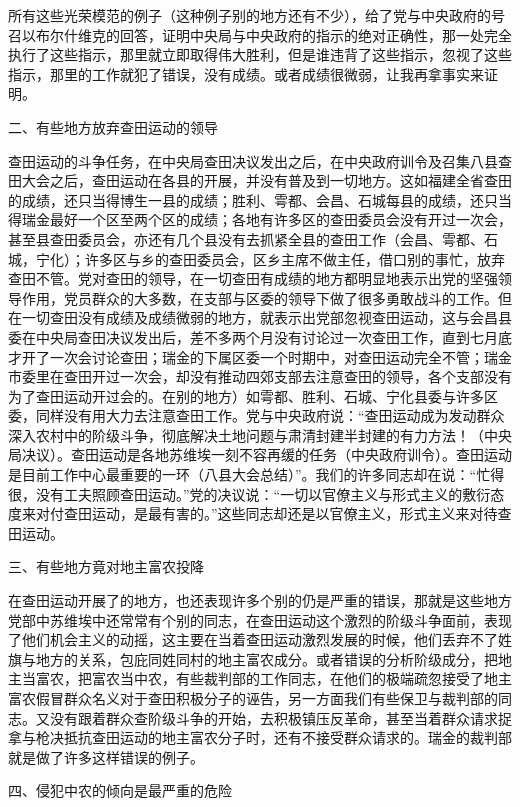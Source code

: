 所有这些光荣模范的例子（这种例子别的地方还有不少），给了党与中央政府的号召以布尔什维克的回答，证明中央局与中央政府的指示的绝对正确性，那一处完全执行了这些指示，那里就立即取得伟大胜利，但是谁违背了这些指示，忽视了这些指示，那里的工作就犯了错误，没有成绩。或者成绩很微弱，让我再拿事实来证明。

二、有些地方放弃查田运动的领导

查田运动的斗争任务，在中央局查田决议发出之后，在中央政府训令及召集八县查田大会之后，查田运动在各县的开展，并没有普及到一切地方。这如福建全省查田的成绩，还只当得博生一县的成绩；胜利、雩都、会昌、石城每县的成绩，还只当得瑞金最好一个区至两个区的成绩；各地有许多区的查田委员会没有开过一次会，甚至县查田委员会，亦还有几个县没有去抓紧全县的查田工作（会昌、雩都、石城，宁化）；许多区与乡的查田委员会，区乡主席不做主任，借口别的事忙，放弃查田不管。党对查田的领导，在一切查田有成绩的地方都明显地表示出党的坚强领导作用，党员群众的大多数，在支部与区委的领导下做了很多勇敢战斗的工作。但在一切查田没有成绩及成绩微弱的地方，就表示出党部忽视查田运动，这与会昌县委在中央局查田决议发出后，差不多两个月没有讨论过一次查田工作，直到七月底才开了一次会讨论查田；瑞金的下属区委一个时期中，对查田运动完全不管；瑞金市委里在查田开过一次会，却没有推动四郊支部去注意查田的领导，各个支部没有为了查田运动开过会的。在别的地方）如雩都、胜利、石城、宁化县委与许多区委，同样没有用大力去注意查田工作。党与中央政府说：“查田运动成为发动群众深入农村中的阶级斗争，彻底解决土地问题与肃清封建半封建的有力方法！（中央局决议）。查田运动是各地苏维埃一刻不容再缓的任务（中央政府训令）。查田运动是目前工作中心最重要的一环（八县大会总结）”。我们的许多同志却在说：“忙得很，没有工夫照顾查田运动。”党的决议说：“一切以官僚主义与形式主义的敷衍态度来对付查田运动，是最有害的。”这些同志却还是以官僚主义，形式主义来对待查田运动。

三、有些地方竟对地主富农投降

在查田运动开展了的地方，也还表现许多个别的仍是严重的错误，那就是这些地方党部中苏维埃中还常常有个别的同志，在查田运动这个激烈的阶级斗争面前，表现了他们机会主义的动摇，这主要在当着查田运动激烈发展的时候，他们丢弃不了姓旗与地方的关系，包庇同姓同村的地主富农成分。或者错误的分析阶级成分，把地主当富农，把富农当中农，有些裁判部的工作同志，在他们的极端疏忽接受了地主富农假冒群众名义对于查田积极分子的诬告，另一方面我们有些保卫与裁判部的同志。又没有跟着群众查阶级斗争的开始，去积极镇压反革命，甚至当着群众请求捉拿与枪决抵抗查田运动的地主富农分子时，还有不接受群众请求的。瑞金的裁判部就是做了许多这样错误的例子。

四、侵犯中农的倾向是最严重的危险

